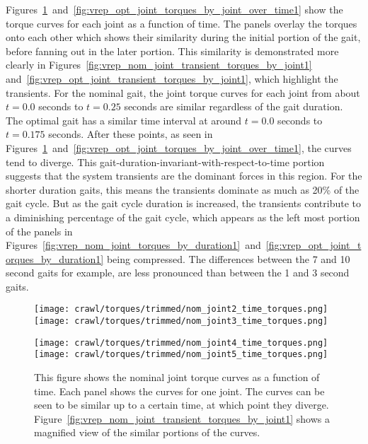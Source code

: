 Figures~\ref{fig:vrep_nom_joint_torques_by_joint_over_time1}~and~\ref{fig:vrep_opt_joint_torques_by_joint_over_time1}
show the torque curves for each joint as a function of time.
The panels overlay the torques onto each other
which shows their similarity during the initial portion of the gait, before fanning out
in the later portion.
This similarity is demonstrated more clearly in Figures~\ref{fig:vrep_nom_joint_transient_torques_by_joint1}
and~\ref{fig:vrep_opt_joint_transient_torques_by_joint1}, which highlight the transients.
For the nominal gait, the joint torque curves for each joint from about $t = 0.0$ seconds to $t = 0.25$ seconds
are similar regardless of the gait duration. The optimal gait has a similar time interval
at around $t = 0.0$ seconds to $t = 0.175$ seconds. After these points, as seen in
Figures~\ref{fig:vrep_nom_joint_torques_by_joint_over_time1}~and~\ref{fig:vrep_opt_joint_torques_by_joint_over_time1},
the curves tend to diverge.
This gait-duration-invariant-with-respect-to-time portion suggests that the system transients are the dominant
forces in this region. For the shorter duration gaits, this means the transients dominate as much as
20\% of the gait cycle. But as the gait cycle duration is increased, the transients
contribute to a diminishing percentage of the gait cycle, which appears as the left most
portion of the panels in Figures~\ref{fig:vrep_nom_joint_torques_by_duration1}~and~\ref{fig:vrep_opt_joint_torques_by_duration1}
being compressed. 
The differences between the 7 and 10 second gaits for example,
are less pronounced than between the 1 and 3 second gaits.

\begin{figure}
  \centerline{
    \texttt{[image: crawl/torques/trimmed/nom\_joint2\_time\_torques.png]}
    \texttt{[image: crawl/torques/trimmed/nom\_joint3\_time\_torques.png]}
  }
  \centerline{
    \texttt{[image: crawl/torques/trimmed/nom\_joint4\_time\_torques.png]}
    \texttt{[image: crawl/torques/trimmed/nom\_joint5\_time\_torques.png]}
  }
  \caption{This figure shows the nominal joint torque curves as a function of time.
           Each panel shows the curves for one joint. The curves can be seen to be similar
           up to a certain time, at which point they diverge. 
           Figure~\ref{fig:vrep_nom_joint_transient_torques_by_joint1} shows a magnified
           view of the similar portions of the curves.}
  \label{fig:vrep_nom_joint_torques_by_joint_over_time1}
\end{figure}

